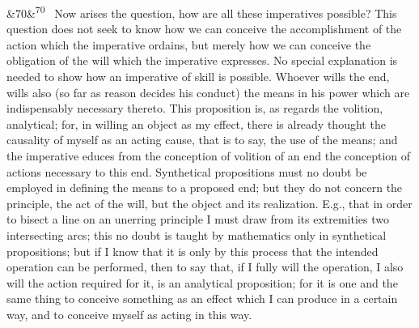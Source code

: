 \documentclass[12pt]{article}
\newcommand{\para}[1][]{\par\noindent\ifx&#1&\else\textsuperscript{\footnotesize #1}~\fi}
\begin{document}
\para[70] Now arises the question, how are all these imperatives possible? This question does not seek to know how we can conceive the accomplishment of the action which the imperative ordains, but merely how we can conceive the obligation of the will which the imperative expresses. No special explanation is needed to show how an imperative of skill is possible. Whoever wills the end, wills also (so far as reason decides his conduct) the means in his power which are indispensably necessary thereto. This proposition is, as regards the volition, analytical; for, in willing an object as my effect, there is already thought the causality of myself as an acting cause, that is to say, the use of the means; and the imperative educes from the conception of volition of an end the conception of actions necessary to this end. Synthetical propositions must no doubt be employed in defining the means to a proposed end; but they do not concern the principle, the act of the will, but the object and its realization. E.g., that in order to bisect a line on an unerring principle I must draw from its extremities two intersecting arcs; this no doubt is taught by mathematics only in synthetical propositions; but if I know that it is only by this process that the intended operation can be performed, then to say that, if I fully will the operation, I also will the action required for it, is an analytical proposition; for it is one and the same thing to conceive something as an effect which I can produce in a certain way, and to conceive myself as acting in this way.
\end{document}
